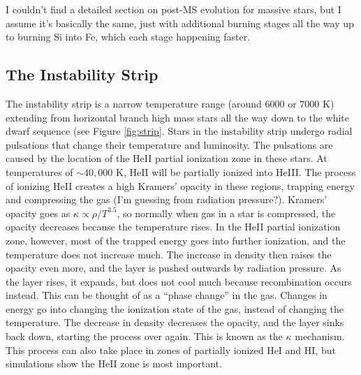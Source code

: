I couldn't find a detailed section on post-MS evolution for massive stars, but I assume it's 
basically the same, just with additional burning stages all the way up to burning Si into Fe, 
which each stage happening faster.

\subsection{The Instability Strip}
The instability strip is a narrow temperature range (around $6000$ or $7000$ K) 
extending from horizontal branch high mass stars all the way down to the white 
dwarf sequence (see Figure \ref{fig:strip}.  Stars in the instability strip 
undergo radial pulsations that change their temperature and luminosity.  
The pulsations are caused by the location of the HeII partial ionization 
zone in these stars.  At temperatures of $\sim40,000$ K, HeII will be partially 
ionized into HeIII.  The process of ionizing HeII creates a high Kramers' 
opacity in these regions, trapping energy and compressing the gas (I'm 
guessing from radiation pressure?).  Kramers' opacity goes as 
$\kappa\propto\rho/T^{3.5}$, so normally when gas in a star is compressed, the 
opacity decreases because the temperature rises.  In the HeII partial 
ionization zone, however, most of the trapped energy goes into further 
ionization, and the temperature does not increase much.  The increase in 
density then raises the opacity even more, and the layer is pushed outwards 
by radiation pressure.  As the layer rises, it expands, but does not cool 
much because recombination occurs instead.  This can be thought of as a 
``phase change'' in the gas.  Changes in energy go into changing the ionization 
state of the gas, instead of changing the temperature.  The decrease in 
density decreases the opacity, and the layer sinks back down, starting the 
process over again.  This is known as the $\kappa$ mechanism.  This 
process can also take place in zones of partially ionized HeI and HI, but 
simulations show the HeII zone is most important.  

